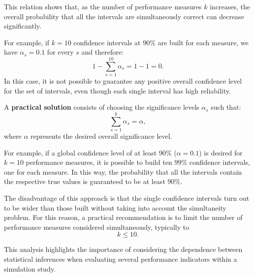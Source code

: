 This relation shows that, as the number of performance measures $k$ increases,
the overall probability that all the intervals are simultaneously correct
can decrease significantly.

For example, if $k=10$ confidence intervals at $90\%$ are built for each
measure, we have $\alpha_s = 0.1$ for every $s$ and therefore:
\[
1 - \sum_{s=1}^{10} \alpha_s = 1 - 1 = 0.
\]
In this case, it is not possible to guarantee any positive overall confidence level
for the set of intervals, even though each single interval has
high reliability.

A \textbf{practical solution} consists of choosing the significance levels
$\alpha_s$ such that:
\[
\sum_{s=1}^{k} \alpha_s = \alpha,
\]
where $\alpha$ represents the desired overall significance level.

For example, if a global confidence level of at least $90\%$
($\alpha = 0.1$) is desired for $k=10$ performance measures, it is possible to build ten
$99\%$ confidence intervals, one for each measure. In this way, the probability
that all the intervals contain the respective true values is guaranteed to be at least
$90\%$.

The disadvantage of this approach is that the single confidence intervals turn out to be
wider than those built without taking into account the
simultaneity problem. For this reason, a practical recommendation is to limit the
number of performance measures considered simultaneously, typically to
\[
k \le 10.
\]

This analysis highlights the importance of considering the dependence between statistical
inferences when evaluating several performance indicators within a
simulation study.

